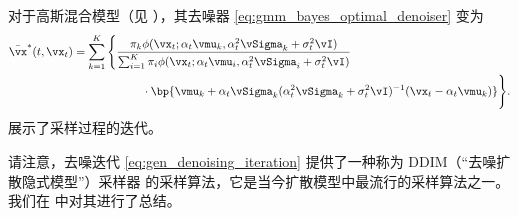 \documentclass[../../book-main_zh.tex]{subfiles}
\begin{document}
\begin{example}[高斯混合模型]
    对于高斯混合模型（见 ），其去噪器 \eqref{eq:gmm_bayes_optimal_denoiser} 变为
    \begin{align}\label{eq:gen_gmm_bayes_optimal_denoiser}
        \bar{\vx}^{\ast}(t, \vx_{t})
        &= \sum_{k = 1}^{K}\Bigg\{\frac{\pi_{k}\phi(\vx_{t}
                    ; \alpha_{t}\vmu_{k}, \alpha_{t}^{2}\vSigma_{k}
            + \sigma_{t}^{2}\vI)}{\sum_{i = 1}^{K}\pi_{i}\phi(\vx_{t} ;
                    \alpha_{t}\vmu_{i}, \alpha_{t}^{2}\vSigma_{i} +
            \sigma_{t}^{2}\vI)} \\
            &\qquad \qquad \qquad \cdot\bp{\vmu_{k} +
                \alpha_{t}\vSigma_{k}(\alpha_{t}^{2}\vSigma_{k} +
        \sigma_{t}^{2}\vI)^{-1}(\vx_{t} - \alpha_{t}\vmu_{k})}\Bigg\}. \nonumber
    \end{align}
     展示了采样过程的迭代。
\end{example}

请注意，去噪迭代 \eqref{eq:gen_denoising_iteration} 提供了一种称为 DDIM（“去噪扩散隐式模型”）采样器 \cite{song2020denoising} 的采样算法，它是当今扩散模型中最流行的采样算法之一。我们在  中对其进行了总结。

\begin{algorithm}
    \caption{使用去噪器进行采样。}
    \label{alg:iterative_denoising}
    \begin{algorithmic}[1]
         
        \EndFor
        \EndFunction
    \end{algorithmic}
\end{algorithm}
\end{document}
